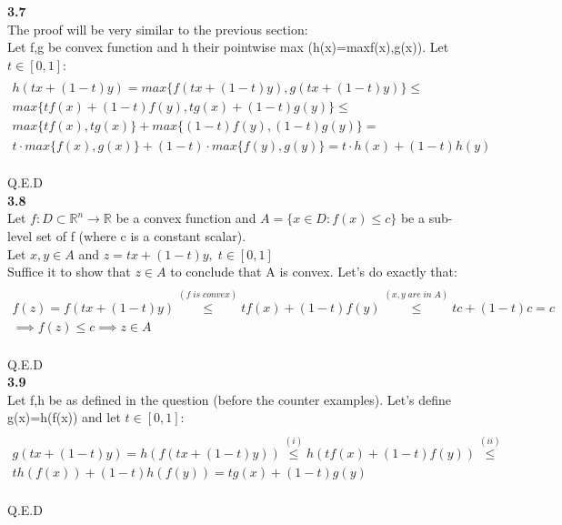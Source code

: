 \documentclass[fleqn]{article}
\begin{document}
\textbf{3.7} \\

The proof will be very similar to the previous section: \\
Let f,g be convex function and h their pointwise max (h(x)=max{f(x),g(x)}).
Let $t \in [0,1]$:\\

\begin{align*} \\
h(tx+(1-t)y) = max\{ f(tx+(1-t)y), g(tx+(1-t)y)\} \leq \\
max\{t f(x)+(1-t)f(y), t g(x)+(1-t)g(y) \}  \leq \\
max\{t f(x), t g(x) \} + max\{(1-t) f(y), (1-t) g(y) \}  = \\
t \cdot max\{f(x), g(x) \} + (1-t)\cdot max\{f(y), g(y) \} = t \cdot h(x)+ (1-t) h(y)
\end{align*} \\
Q.E.D \\


\textbf{3.8} \\
Let $f:D \subset \mathbb{R}^n \rightarrow \mathbb{R}$ be a convex function and $A= \{ x \in D:f(x) \leq c\}$ be a sub-level set of f (where c is a constant scalar). \\
Let $x,y \in A$ and $z = tx +(1-t)y, \; t\in [0,1]$\\

Suffice it to show that $z \in A$ to conclude that A is convex. Let's do exactly that:\\

\begin{align*} \\
f(z) = f(tx +(1-t)y) \stackrel{(f \; is \; convex)}{\leq} tf(x)+(1-t)f(y) 
\stackrel{(x,y \; are \; in \; A)}{\leq}tc+(1-t)c = c \\
\implies f(z) \leq c \implies z \in A
\end{align*} \\

Q.E.D \\


\textbf{3.9} \\

Let f,h be as defined in the question (before the counter examples). Let's define g(x)=h(f(x)) and let $t\in [0,1]$: \\

\begin{align*} \\
g(tx+(1-t)y) = h(f(tx+(1-t)y)) \stackrel{(i)}{\leq} h(tf(x)+(1-t)f(y)) \stackrel{(ii)}{\leq}  \\ th(f(x))+(1-t)h(f(y)) = tg(x)+(1-t)g(y)
\end{align*} \\
Q.E.D \\
\end{document}
